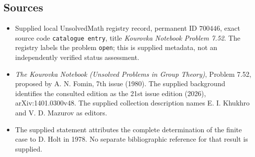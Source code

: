 \documentclass[11pt]{article}
\begin{document}
\subsection{Sources}
\begin{itemize}
\item Supplied local UnsolvedMath registry record, permanent ID \(700446\), exact source code \texttt{catalogue entry}, title \emph{Kourovka Notebook Problem 7.52}. The registry labels the problem \texttt{open}; this is supplied metadata, not an independently verified status assessment.
\item \emph{The Kourovka Notebook (Unsolved Problems in Group Theory)}, Problem 7.52, proposed by A. N. Fomin, 7th issue (1980). The supplied background identifies the consulted edition as the 21st issue edition (2026), arXiv:1401.0300v48. The supplied collection description names E. I. Khukhro and V. D. Mazurov as editors.
\item The supplied statement attributes the complete determination of the finite case to D. Holt in 1978. No separate bibliographic reference for that result is supplied.
\end{itemize}
\end{document}
